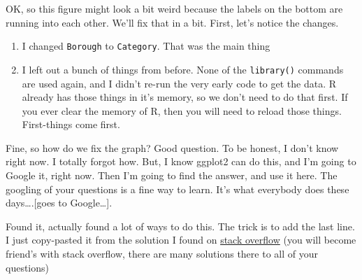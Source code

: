 \documentclass[]{book}
\newenvironment{Shaded}{\begin{snugshade}}{\end{snugshade}}
\newcommand{\KeywordTok}[1]{\textcolor[rgb]{0.13,0.29,0.53}{\textbf{#1}}}
\newcommand{\DataTypeTok}[1]{\textcolor[rgb]{0.13,0.29,0.53}{#1}}
\newcommand{\DecValTok}[1]{\textcolor[rgb]{0.00,0.00,0.81}{#1}}
\newcommand{\StringTok}[1]{\textcolor[rgb]{0.31,0.60,0.02}{#1}}
\newcommand{\OperatorTok}[1]{\textcolor[rgb]{0.81,0.36,0.00}{\textbf{#1}}}
\newcommand{\NormalTok}[1]{#1}
\begin{document}
OK, so this figure might look a bit weird because the labels on the
bottom are running into each other. We'll fix that in a bit. First,
let's notice the changes.

\begin{enumerate}
\def\labelenumi{\arabic{enumi}.}
\item
  I changed \texttt{Borough} to \texttt{Category}. That was the main
  thing
\item
  I left out a bunch of things from before. None of the
  \texttt{library()} commands are used again, and I didn't re-run the
  very early code to get the data. R already has those things in it's
  memory, so we don't need to do that first. If you ever clear the
  memory of R, then you will need to reload those things. First-things
  come first.
\end{enumerate}

Fine, so how do we fix the graph? Good question. To be honest, I don't
know right now. I totally forgot how. But, I know ggplot2 can do this,
and I'm going to Google it, right now. Then I'm going to find the
answer, and use it here. The googling of your questions is a fine way to
learn. It's what everybody does these days\ldots{}.{[}goes to
Google\ldots{}{]}.

Found it, actually found a lot of ways to do this. The trick is to add
the last line. I just copy-pasted it from the solution I found on
\href{https://stackoverflow.com/questions/1330989/rotating-and-spacing-axis-labels-in-ggplot2}{stack
overflow} (you will become friend's with stack overflow, there are many
solutions there to all of your questions)

\begin{Shaded}
\end{Shaded}
\end{document}

